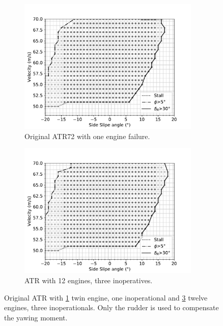 
\begin{figure}[hbt!]
	\centering
	\begin{subfigure}{0.49\textwidth}
		\includegraphics[width=0.95\textwidth]{originalMapBetaVelfin1Eng3RudFalse}
		\caption{Original ATR72 with one engine failure.}
		\label{fig:originalfin1_3engine}
	\end{subfigure}
	\begin{subfigure}{0.49\textwidth}
		\includegraphics[width=0.95\textwidth]{originalMapBetaVelfin1Eng15RudFalse}
		\caption{ATR with 12 engines, three inoperatives.}
		\label{fig:originalfin1_15engine}
	\end{subfigure}
	\caption{Original ATR with \ref{fig:originalfin1_3engine} twin engine, one inoperational and \ref{fig:originalfin1_15engine} twelve engines, three inoperationals. Only the rudder is used to compensate the yawing moment.}
\end{figure}

